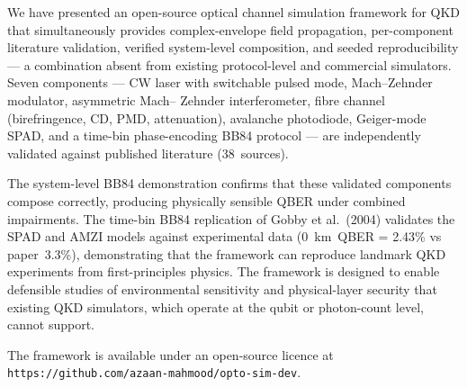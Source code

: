 \documentclass[11pt,a4paper]{article}
\begin{document}
We have presented an open-source optical channel simulation framework
for QKD that simultaneously provides complex-envelope field propagation,
per-component literature validation, verified system-level composition,
and seeded reproducibility --- a combination absent from existing
protocol-level and commercial simulators.  Seven components --- CW laser
with switchable pulsed mode, Mach--Zehnder modulator, asymmetric Mach--
Zehnder interferometer, fibre channel (birefringence, CD, PMD,
attenuation), avalanche photodiode, Geiger-mode SPAD, and a time-bin
phase-encoding BB84 protocol --- are independently validated against
published literature (38~sources).

The system-level BB84 demonstration confirms that these validated
components compose correctly, producing physically sensible QBER
under combined impairments.  The time-bin BB84 replication of Gobby
et al.~(2004) validates the SPAD and AMZI models against experimental
data (0~km~QBER = 2.43\% vs paper~3.3\%), demonstrating that the
framework can reproduce landmark QKD experiments from first-principles
physics.  The framework is designed to enable defensible studies of
environmental sensitivity and physical-layer security that existing
QKD simulators, which operate at the qubit or photon-count level,
cannot support.

The framework is available under an open-source licence at
\texttt{https://github.com/azaan-mahmood/opto-sim-dev}.
\end{document}
